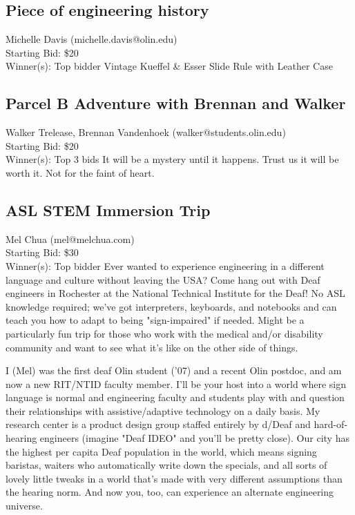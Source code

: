\documentclass[11pt]{article}
\begin{document}
\subsection{Piece of engineering history}
Michelle Davis (michelle.davis@olin.edu) \\
Starting Bid: \$20 \\
Winner(s): 
Top bidder\newline
Vintage Kueffel \& Esser Slide Rule with Leather Case
\subsection{Parcel B Adventure with Brennan and Walker}
Walker Trelease, Brennan Vandenhoek (walker@students.olin.edu) \\
Starting Bid: \$20 \\
Winner(s): 
Top 3 bids\newline
It will be a mystery until it happens. Trust us it will be worth it. Not for the faint of heart.
\subsection{ASL STEM Immersion Trip}
Mel Chua (mel@melchua.com) \\
Starting Bid: \$30 \\
Winner(s): 
Top bidder\newline
Ever wanted to experience engineering in a different language and culture without leaving the USA? Come hang out with Deaf engineers in Rochester at the National Technical Institute for the Deaf! No ASL knowledge required; we've got interpreters, keyboards, and notebooks and can teach you how to adapt to being "sign-impaired" if needed. Might be a particularly fun trip for those who work with the medical and/or disability community and want to see what it's like on the other side of things.

I (Mel) was the first deaf Olin student ('07) and a recent Olin postdoc, and am now a new RIT/NTID faculty member. I'll be your host into a world where sign language is normal and engineering faculty and students play with and question their relationships with assistive/adaptive technology on a daily basis. My research center is a product design group staffed entirely by d/Deaf and hard-of-hearing engineers (imagine "Deaf IDEO" and you'll be pretty close). Our city has the highest per capita Deaf population in the world, which means signing baristas, waiters who automatically write down the specials, and all sorts of lovely little tweaks in a world that's made with very different assumptions than the hearing norm. And now you, too, can experience an alternate engineering universe.
\end{document}
